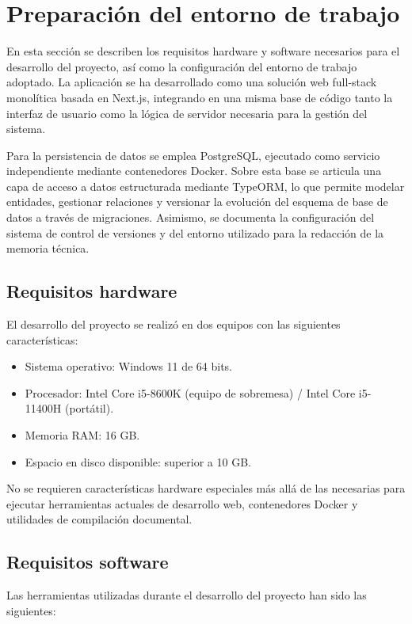 \section{Preparación del entorno de trabajo}

En esta sección se describen los requisitos hardware y software necesarios para el desarrollo del proyecto, así como la configuración del entorno de trabajo adoptado. La aplicación se ha desarrollado como una solución web full-stack monolítica basada en Next.js, integrando en una misma base de código tanto la interfaz de usuario como la lógica de servidor necesaria para la gestión del sistema.

Para la persistencia de datos se emplea PostgreSQL, ejecutado como servicio independiente mediante contenedores Docker. Sobre esta base se articula una capa de acceso a datos estructurada mediante TypeORM, lo que permite modelar entidades, gestionar relaciones y versionar la evolución del esquema de base de datos a través de migraciones. Asimismo, se documenta la configuración del sistema de control de versiones y del entorno utilizado para la redacción de la memoria técnica.

\subsection{Requisitos hardware}

El desarrollo del proyecto se realizó en dos equipos con las siguientes características:

\begin{itemize}
    \item Sistema operativo: Windows 11 de 64 bits.
    \item Procesador: Intel Core i5-8600K (equipo de sobremesa) / Intel Core i5-11400H (portátil).
    \item Memoria RAM: 16 GB.
    \item Espacio en disco disponible: superior a 10 GB.
\end{itemize}

No se requieren características hardware especiales más allá de las necesarias para ejecutar herramientas actuales de desarrollo web, contenedores Docker y utilidades de compilación documental.

\subsection{Requisitos software}

Las herramientas utilizadas durante el desarrollo del proyecto han sido las siguientes:

